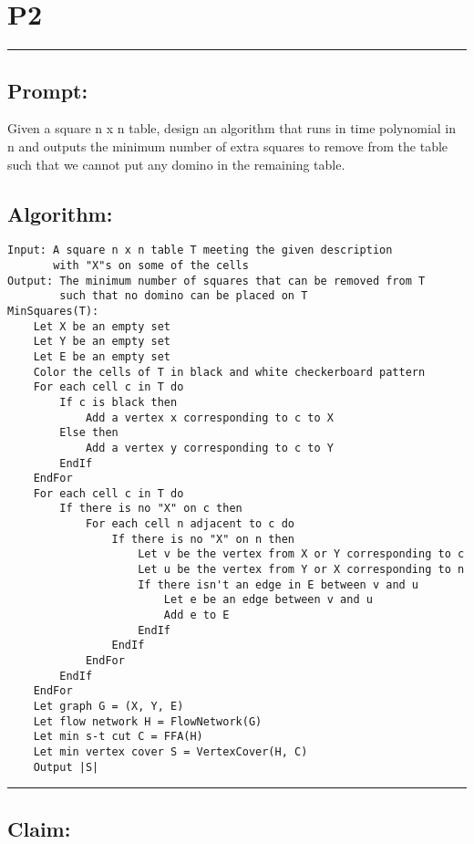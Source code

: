 \documentclass[11pt]{article}
\title{}
\author{}
\date{}
\begin{document}
\section*{P2}

\noindent\textcolor[RGB]{220,220,220}{\rule{\linewidth}{0.8pt}}

\subsection*{Prompt:} 

Given a square n x n table, design an algorithm that runs in time polynomial in n and outputs the minimum number of extra squares to remove from the table such that we cannot put any domino in the remaining table.

\subsection*{Algorithm:} 

\begin{lstlisting}[basicstyle=\small, mathescape=true]
Input: A square n x n table T meeting the given description
	   with "X"s on some of the cells
Output: The minimum number of squares that can be removed from T
		such that no domino can be placed on T
MinSquares(T):
	Let X be an empty set
	Let Y be an empty set
	Let E be an empty set
	Color the cells of T in black and white checkerboard pattern
	For each cell c in T do
		If c is black then
			Add a vertex x corresponding to c to X
		Else then
			Add a vertex y corresponding to c to Y
		EndIf
	EndFor
	For each cell c in T do
		If there is no "X" on c then
			For each cell n adjacent to c do
				If there is no "X" on n then
					Let v be the vertex from X or Y corresponding to c
					Let u be the vertex from Y or X corresponding to n
					If there isn't an edge in E between v and u
						Let e be an edge between v and u
						Add e to E
					EndIf
				EndIf
			EndFor
		EndIf
	EndFor
	Let graph G = (X, Y, E)
	Let flow network H = FlowNetwork(G)
	Let min s-t cut C = FFA(H)
	Let min vertex cover S = VertexCover(H, C)
	Output |S|	
\end{lstlisting}

\noindent\textcolor[RGB]{220,220,220}{\rule{\linewidth}{0.8pt}}
\linebreak

\subsection*{Claim:} 
\end{document}
